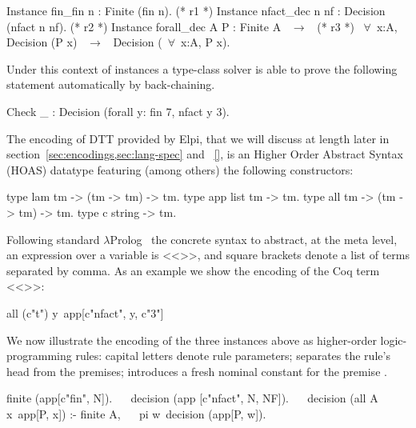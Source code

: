 \documentclass[sigconf,natbib=false]{acmart}
\begin{document}
\begin{coqcode}
Instance fin_fin n : Finite (fin n).             (* r1 *)
Instance nfact_dec n nf : Decision (nfact n nf). (* r2 *)
Instance forall_dec A P : Finite A ~$\to$~            (* r3 *)
  ~$\forall$~x:A, Decision (P x) ~$\to$~ Decision (~$\forall$~x:A, P x).
\end{coqcode}

\noindent Under this context of instances a type-class solver is able to prove
the following statement automatically by back-chaining.

\begin{coqcode}
  Check _ : Decision (forall y: fin 7, nfact y 3).   ~~
\end{coqcode}

\noindent
The encoding of DTT provided by Elpi, that we will discuss at length later in
section~\ref{sec:encodings,sec:lang-spec} and ~\ref{}, is an Higher Order Abstract
Syntax (HOAS) datatype  featuring (among others) the following
constructors:

\begin{elpicode}
type lam  tm -> (tm -> tm) -> tm.     %
type app  list tm -> tm.              %
type all  tm -> (tm -> tm) -> tm.     %
type c    string -> tm.               %
\end{elpicode}

\noindent
Following standard $\lambda$Prolog~\cite{miller_nadathur_2012}
the concrete syntax to abstract, at the meta level, an expression
 over a variable 
is <<>>, and square brackets denote a list of
terms separated by comma. As an example we show the encoding of the Coq term
<<>>:

\begin{elpicode}
all (c"t") y\ app[c"nfact", y, c"3"]
\end{elpicode}

\noindent
We now illustrate the encoding of the three instances above as higher-order
logic-programming rules: capital letters denote rule
parameters; \elpiIn{:-} separates the rule's head from the premises;
 introduces a fresh nominal constant 
for the premise .

\begin{elpicode}
finite (app[c"fin", N]).                              ~~
decision (app [c"nfact", N, NF]).                     ~~
decision (all A x\ app[P, x]) :- finite A,            ~~
  pi w\ decision (app[P, w]).
\end{elpicode}
\end{document}

